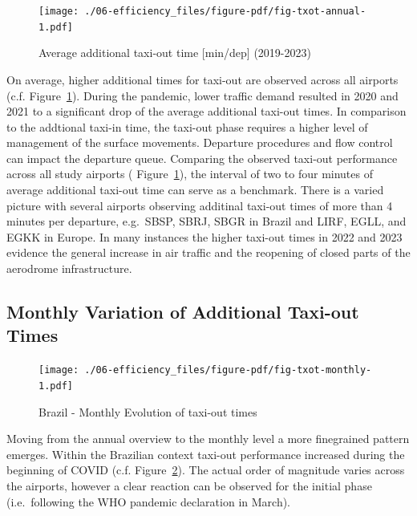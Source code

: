 \documentclass[
  a4paper,
  DIV=11,
  numbers=noendperiod]{scrreport}
\begin{document}
\begin{figure}[H]

{\centering \texttt{[image: ./06-efficiency\_files/figure-pdf/fig-txot-annual-1.pdf]}

}

\caption{\label{fig-txot-annual}Average additional taxi-out time
{[}min/dep{]} (2019-2023)}

\end{figure}

On average, higher additional times for taxi-out are observed across all
airports (c.f. Figure~\ref{fig-txot-annual}). During the pandemic, lower
traffic demand resulted in 2020 and 2021 to a significant drop of the
average additional taxi-out times. In comparison to the addtional
taxi-in time, the taxi-out phase requires a higher level of management
of the surface movements. Departure procedures and flow control can
impact the departure queue. Comparing the observed taxi-out performance
across all study airports ( Figure~\ref{fig-txot-annual}), the interval
of two to four minutes of average additional taxi-out time can serve as
a benchmark. There is a varied picture with several airports observing
additinal taxi-out times of more than 4 minutes per departure,
e.g.~SBSP, SBRJ, SBGR in Brazil and LIRF, EGLL, and EGKK in Europe. In
many instances the higher taxi-out times in 2022 and 2023 evidence the
general increase in air traffic and the reopening of closed parts of the
aerodrome infrastructure.

\hypertarget{monthly-variation-of-additional-taxi-out-times}{%
\subsection{Monthly Variation of Additional Taxi-out
Times}\label{monthly-variation-of-additional-taxi-out-times}}

\begin{figure}[H]

{\centering \texttt{[image: ./06-efficiency\_files/figure-pdf/fig-txot-monthly-1.pdf]}

}

\caption{\label{fig-txot-monthly}Brazil - Monthly Evolution of taxi-out
times}

\end{figure}

Moving from the annual overview to the monthly level a more finegrained
pattern emerges. Within the Brazilian context taxi-out performance
increased during the beginning of COVID (c.f.
Figure~\ref{fig-txot-monthly}). The actual order of magnitude varies
across the airports, however a clear reaction can be observed for the
initial phase (i.e.~following the WHO pandemic declaration in March).
\end{document}
